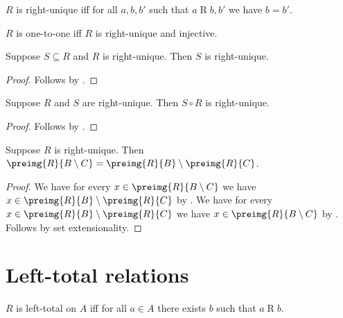 \begin{definition}\label{rightunique}
    $R$ is right-unique iff
    for all $a,b,b'$ such that $a\mathrel{R} b, b'$ we have $b = b'$.
\end{definition}

\begin{abbreviation}\label{onetoone}
    $R$ is one-to-one iff $R$ is right-unique and injective.
\end{abbreviation}

\begin{proposition}\label{subseteq_of_rightunique_is_rightunique}
    Suppose $S\subseteq R$ and $R$ is right-unique.
    Then $S$ is right-unique.
\end{proposition}
\begin{proof}
    Follows by .
\end{proof}

\begin{proposition}\label{circ_rightunique}
    Suppose $R$ and $S$ are right-unique.
    Then $S\circ R$ is right-unique.
\end{proposition}
\begin{proof}
    Follows by .
\end{proof}

\begin{proposition}\label{preimg_setminus_of_rightunique}
    Suppose $R$ is right-unique.
    Then
        $\preimg{R}{B\setminus C}
            =\preimg{R}{B}\setminus\preimg{R}{C}$.
\end{proposition}
\begin{proof}
    We have for every $x\in\preimg{R}{B\setminus C}$
        we have $x\in\preimg{R}{B}\setminus\preimg{R}{C}$
        by .
    We have for every $x\in\preimg{R}{B}\setminus\preimg{R}{C}$
        we have $x\in\preimg{R}{B\setminus C}$
        by .
    Follows by set extensionality.
\end{proof}



\section{Left-total relations}

\begin{definition}\label{lefttotal}
    $R$ is left-total on $A$ iff
    for all $a\in A$ there exists $b$ such that $a\mathrel{R} b$.
\end{definition}


